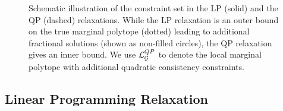 \begin{figure}[htb]
    \centering
    
    \caption[Constraint set of the LP and QP relaxations]{Schematic
    illustration of the constraint set in the \ac{LP} (solid) and the \ac{QP}
    (dashed) relaxations.
    While the \ac{LP} relaxation is an outer bound on the true marginal
    polytope (dotted) leading to additional fractional solutions (shown as
    non-filled circles), the \ac{QP} relaxation
    gives an inner bound. We use $\mathcal{L}_{\mathcal{G}}^{QP}$ to
    denote the local marginal polytope with additional quadratic consistency
    constraints.}
    \label{fig:lpqp:lp_and_qp_constraint_set}
\end{figure}

\subsection{Linear Programming Relaxation}

